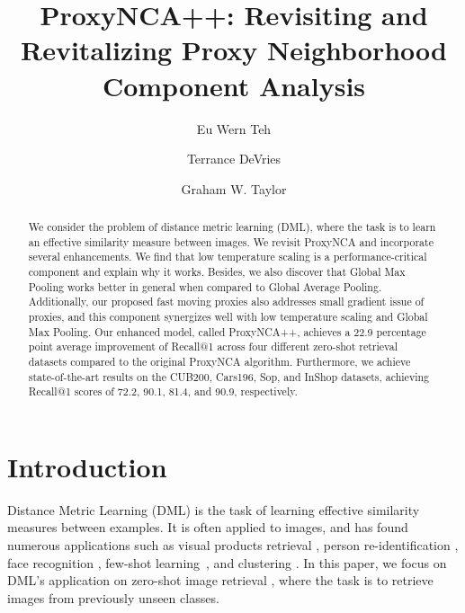 \documentclass[runningheads]{llncs}
\begin{document}
\pagestyle{headings}
\mainmatter


\title{ProxyNCA++: Revisiting and Revitalizing Proxy Neighborhood Component Analysis} 



\author{Eu Wern Teh \and
Terrance DeVries \and
Graham W. Taylor}
\maketitle

\begin{abstract}

We consider the problem of distance metric learning (DML), where the task is to learn an effective similarity measure between images.
We revisit ProxyNCA and incorporate several enhancements. We find that low temperature scaling is a performance-critical component and explain why it works. Besides, we also discover that Global Max Pooling works better in general when compared to Global Average Pooling. Additionally, our proposed fast moving proxies also addresses small gradient issue of proxies, and this component synergizes well with low temperature scaling and Global Max Pooling.
Our enhanced model, called ProxyNCA++, achieves a 22.9 percentage point average improvement of Recall@1 across four different zero-shot retrieval datasets compared to the original ProxyNCA algorithm.
Furthermore, we achieve state-of-the-art results on the CUB200, Cars196, Sop, and InShop datasets, achieving Recall@1 scores of 72.2, 90.1, 81.4, and 90.9, respectively. 

\end{abstract}

\section{Introduction}\label{sec:intro}

Distance Metric Learning (DML) is the task of learning effective similarity measures between examples. It is often applied to images, and has found numerous applications such as visual products retrieval \cite{liu2016deepfashion,song2016deep,Bell2015}, person re-identification \cite{Zheng_2019_CVPR,Wang:2018:LDF:3240508.3240552}, face recognition \cite{Schroff_2015_CVPR}, few-shot learning~\cite{Vinyals:2016:MNO:3157382.3157504,koch2015siamese}, and clustering \cite{7471631}. In this paper, we focus on DML's application on zero-shot image retrieval \cite{movshovitz2017no,wu2017sampling,song2016deep,jacob2019metric}, where the task is to retrieve images from previously unseen classes.
\end{document}

